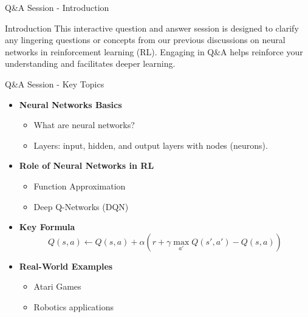 \documentclass[aspectratio=169]{beamer}
\begin{document}
\begin{frame}[fragile]{Q\&A Session - Introduction}
    \begin{block}{Introduction}
        This interactive question and answer session is designed to clarify any lingering questions or concepts from our previous discussions on neural networks in reinforcement learning (RL). Engaging in Q\&A helps reinforce your understanding and facilitates deeper learning.
    \end{block}
\end{frame}

\begin{frame}[fragile]{Q\&A Session - Key Topics}
    \begin{itemize}
        \item \textbf{Neural Networks Basics}
            \begin{itemize}
                \item What are neural networks?
                \item Layers: input, hidden, and output layers with nodes (neurons).
            \end{itemize}
        
        \item \textbf{Role of Neural Networks in RL}
            \begin{itemize}
                \item Function Approximation
                \item Deep Q-Networks (DQN)
            \end{itemize}
    
        \item \textbf{Key Formula}
            \begin{equation}
            Q(s, a) \leftarrow Q(s, a) + \alpha \left( r + \gamma \max_{a'}Q(s', a') - Q(s, a) \right)
            \end{equation}
        \item \textbf{Real-World Examples}
            \begin{itemize}
                \item Atari Games
                \item Robotics applications
            \end{itemize}
    \end{itemize}
\end{frame}
\end{document}
